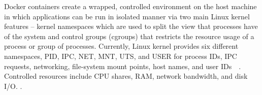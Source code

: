 





Docker containers create a wrapped, controlled environment on the host machine in which applications can be run in isolated manner via two main Linux kernel features -- kernel namespaces which are used to split the view that processes have of the system and control groups (cgroups) that restricts the resource usage of a process or group of processes.
%
Currently, Linux kernel provides six different namespaces, PID, IPC, NET, MNT, UTS, and USER for process IDs, IPC requests, networking, file-system mount points, host names, and user IDs~\cite{xxx}~\cite{xxx}.
%
Controlled resources include CPU shares, RAM, network bandwidth, and disk I/O.
%
.



